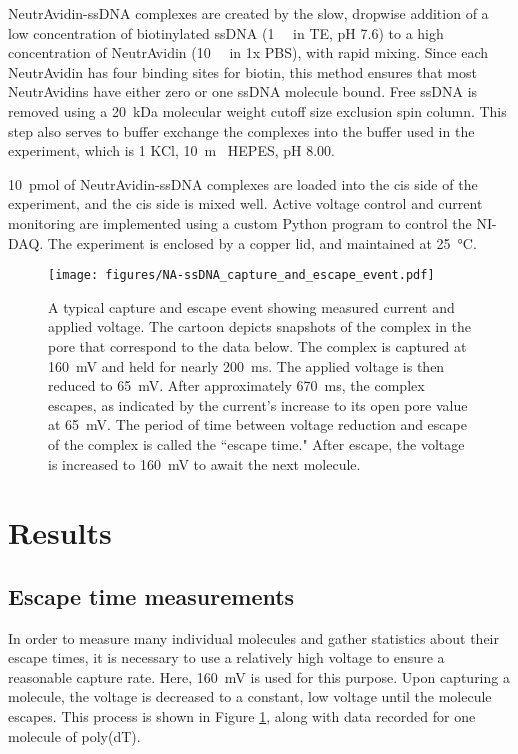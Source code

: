 NeutrAvidin-ssDNA complexes are created by the slow, dropwise addition of a low concentration of biotinylated ssDNA (\SI{1}{\micro\Molar} in TE, pH 7.6) to a high concentration of NeutrAvidin (\SI{10}{\micro\Molar} in 1x PBS), with rapid mixing.  Since each NeutrAvidin has four binding sites for biotin, this method ensures that most NeutrAvidins have either zero or one ssDNA molecule bound.  Free ssDNA is removed using a \SI{20}{\kilo\dalton} molecular weight cutoff size exclusion spin column.  This step also serves to buffer exchange the complexes into the buffer used in the experiment, which is \SI{1}{\Molar} KCl, \SI{10}{\m\Molar} HEPES, pH \num{8.00}.

\SI{10}{\pico\mole} of NeutrAvidin-ssDNA complexes are loaded into the cis side of the experiment, and the cis side is mixed well.  Active voltage control and current monitoring are implemented using a custom Python program to control the NI-DAQ.  The experiment is enclosed by a copper lid, and maintained at \SI{25}{\celsius}.

\begin{figure}[h]
\begin{centering}
\texttt{[image: figures/NA-ssDNA\_capture\_and\_escape\_event.pdf]}
\caption[Capture and escape experiment schematically]{A typical capture and escape event showing measured current and applied voltage. The cartoon depicts snapshots of the complex in the pore that correspond to the data below.  The complex is captured at \SI{160}{\mV} and held for nearly \SI{200}{\ms}.  The applied voltage is then reduced to \SI{65}{\mV}.  After approximately \SI{670}{\ms}, the complex escapes, as indicated by the current's increase to its open pore value at \SI{65}{\mV}.  The period of time between voltage reduction and escape of the complex is called the ``escape time."  After escape, the voltage is increased to \SI{160}{\mV} to await the next molecule.}
\label{fig:capture_escape_event}
\end{centering}
\end{figure}

\section{Results}

\subsection{Escape time measurements}

In order to measure many individual molecules and gather statistics about their escape times, it is necessary to use a relatively high voltage to ensure a reasonable capture rate.  Here, \SI{160}{\mV} is used for this purpose.  Upon capturing a molecule, the voltage is decreased to a constant, low voltage until the molecule escapes.  This process is shown in Figure \ref{fig:capture_escape_event}, along with data recorded for one molecule of poly(dT).

